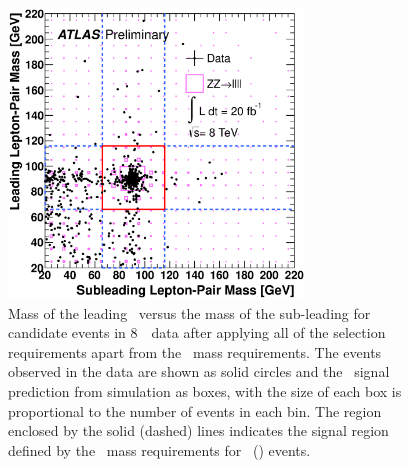  \begin{figure}[htbp]
 \begin{center}
  \includegraphics[width=0.7\textwidth]{8TeV/h_mz1_mz2}\hfill
  \caption[Mass of the leading \leppair\ versus the mass of the
  sub-leading \leppair\ for candidate events in 8~\tev\ data, after applying all of the selection
  requirements apart from the \dilepton\ mass requirements.]
  {\small Mass of the leading \leppair\ versus the mass of the
  sub-leading \leppair for candidate events in 8~\tev\ data after
  applying all of the selection
  requirements apart from the \dilepton\ mass requirements.
  The events observed in the data are shown as solid circles and the \ZZsllll\
  signal prediction from simulation as boxes, with 
  the size of each box is proportional to the number of events in each bin.  
  The region enclosed by the solid (dashed) lines indicates the signal region defined by the
  \dilepton\ mass requirements for \ZZ\ (\ZZs) events.
   }
    \label{fig:zzdists-Zmass2D-eight}
 \end{center}
 \end{figure}

